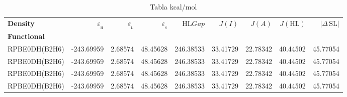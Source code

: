 \documentclass[preprint,landscape,12pt]{elsarticle}
\begin{document}
	\begin{table}
		\caption{ Tabla kcal/mol}
		\centering
		\footnotesize
		\begin{tabular}{lrrrrrrrr}
			\hline
			\textbf{Density}    & $\varepsilon_{_{\mathrm{H}}}$	& $\varepsilon_{_{\mathrm{L}}}$  & $\varepsilon_{_{\mathrm{S}}}$& HL$Gap$ & $J(I)$ & $J(A)$ & $J(\mathrm{HL})$  & \textbf{$\left|\Delta\,\mathrm{SL}\right|$}  \\
			\textbf{Functional} &   &  &     &   &  &  &  &  \\
			\hline \hline 

RPBE0DH(B2H6) & -243.69959 & 2.68574 & 48.45628 & 246.38533 & 33.41729 & 22.78342 & 40.44502 & 45.77054\\
RPBE0DH(B2H6) & -243.69959 & 2.68574 & 48.45628 & 246.38533 & 33.41729 & 22.78342 & 40.44502 & 45.77054\\
RPBE0DH(B2H6) & -243.69959 & 2.68574 & 48.45628 & 246.38533 & 33.41729 & 22.78342 & 40.44502 & 45.77054\\
RPBE0DH(B2H6) & -243.69959 & 2.68574 & 48.45628 & 246.38533 & 33.41729 & 22.78342 & 40.44502 & 45.77054\\

	 		\hline
		\end{tabular}
			\label{tab:kcal/mol}
	\end{table}
\end{document}
